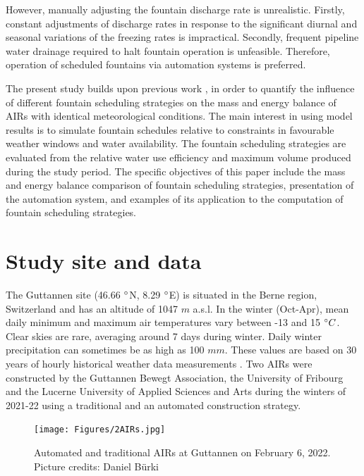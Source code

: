 \documentclass[tc, manuscript]{copernicus}
\begin{document}
However, manually adjusting the fountain discharge rate is unrealistic. Firstly, constant adjustments of
discharge rates in response to the significant diurnal and seasonal variations of the freezing rates is
impractical. Secondly, frequent pipeline water drainage required to halt fountain operation is unfeasible.
Therefore, operation of scheduled fountains via automation systems is preferred.

The present study builds upon previous work \citep{balasubramanianInfluenceMeteorologicalConditions2022,
oerlemansBriefCommunicationGrowth2021}, in order to quantify the influence of different fountain scheduling
strategies on the mass and energy balance of AIRs with identical meteorological conditions. The main interest in
using model results is to simulate fountain schedules relative to constraints in favourable weather windows and
water availability. The fountain scheduling strategies are evaluated from the relative water use efficiency and
maximum volume produced during the study period. The specific objectives of this paper include the mass and
energy balance comparison of fountain scheduling strategies, presentation of the automation system, and examples
of its application to the computation of fountain scheduling strategies.

\section{Study site and data}

The Guttannen site (46.66 $^{\circ}$N, 8.29 $^{\circ}$E) is situated in the Berne region, Switzerland and has an
altitude of 1047 $m$ a.s.l. In the winter (Oct-Apr), mean daily minimum and maximum air temperatures vary
between -13 and 15 $^{\circ} C$. Clear skies are rare, averaging around 7 days during winter. Daily winter
precipitation can sometimes be as high as 100 $mm$. These values are based on 30 years of hourly historical
weather data measurements \citep{meteoblueClimateGuttannen2021}. Two AIRs were constructed by the Guttannen Bewegt Association,
the University of Fribourg and the Lucerne University of Applied Sciences and Arts during the winters of 2021-22
using a traditional and an automated construction strategy.

\begin{figure}[t]
\texttt{[image: Figures/2AIRs.jpg]}
\caption{Automated and traditional AIRs at Guttannen on February 6, 2022. Picture credits: Daniel Bürki}
\label{fig:2AIR} 
\end{figure}
\end{document}

